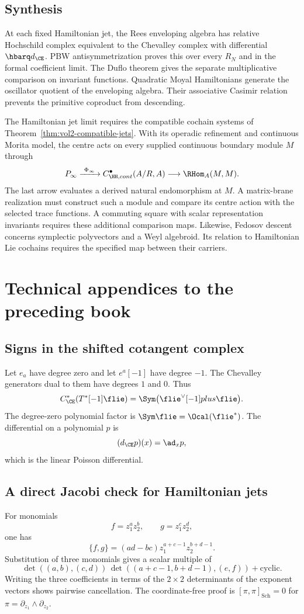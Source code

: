 \chapter{Synthesis}
At each fixed Hamiltonian jet, the Rees enveloping algebra has relative
Hochschild complex equivalent to the Chevalley complex with differential
$\hbarq d_{\CE}$.
PBW antisymmetrization proves this over every $R_N$ and in the formal coefficient limit.
The Duflo theorem gives the separate multiplicative comparison on invariant functions.
Quadratic Moyal Hamiltonians generate the oscillator quotient of the enveloping algebra.
Their associative Casimir relation prevents the primitive coproduct from descending.

The Hamiltonian jet limit requires the compatible cochain systems of
Theorem~\ref{thm:vol2-compatible-jets}.
With its operadic refinement and continuous Morita model, the centre acts
on every supplied continuous boundary module $M$ through
\[
 \mathcal P_\infty
 \xrightarrow{\ \Phi_\infty\ }
 C^\bullet_{\HH,\mathrm{cont}}(\mathcal A/R,\mathcal A)
 \longrightarrow\RHom_{\mathcal A}(M,M).
\]
The last arrow evaluates a derived natural endomorphism at $M$.
A matrix-brane realization must construct such a module and compare its
centre action with the selected trace functions.
A commuting square with scalar representation invariants requires these
additional comparison maps.
Likewise, Fedosov descent concerns symplectic polyvectors and a Weyl algebroid.
Its relation to Hamiltonian Lie cochains requires the specified map between their carriers.

\part{Technical appendices to the preceding book}
\chapter{Signs in the shifted cotangent complex}
Let $e_a$ have degree zero and let $e^a[-1]$ have degree $-1$.  The Chevalley generators dual to them have degrees $1$ and $0$.  Thus
\[
 C^*_{\CE}(T^*[-1]\flie)
 =\Sym\bigl(\flie^\vee[-1]\oplus\flie\bigr).
\]
The degree-zero polynomial factor is $\Sym\flie=\Ocal(\flie^*)$.  The differential on a polynomial $p$ is
\[
 (d_{\CE}p)(x)=\ad_xp,
\]
which is the linear Poisson differential.

\chapter{A direct Jacobi check for Hamiltonian jets}
For monomials
\[
 f=z_1^az_2^b,
 \qquad
 g=z_1^cz_2^d,
\]
one has
\[
 \{f,g\}=(ad-bc)z_1^{a+c-1}z_2^{b+d-1}.
\]
Substitution of three monomials gives a scalar multiple of
\[
 \det((a,b),(c,d))\,\det((a+c-1,b+d-1),(e,f)) + \mathrm{cyclic}.
\]
Writing the three coefficients in terms of the $2\times2$ determinants of the exponent vectors shows pairwise cancellation.  The coordinate-free proof is $[\pi,\pi]_{\mathrm{Sch}}=0$ for $\pi=\partial_{z_1}\wedge\partial_{z_2}$.


